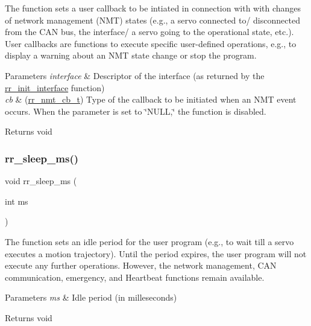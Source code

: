 The function sets a user callback to be intiated in connection with with changes of network management (N\+MT) states (e.\+g., a servo connected to/ disconnected from the C\+AN bus, the interface/ a servo going to the operational state, etc.). User callbacks are functions to execute specific user-\/defined operations, e.\+g., to display a warning about an N\+MT state change or stop the program. 


\begin{DoxyParams}{Parameters}
{\em interface} & Descriptor of the interface (as returned by the \hyperlink{group___common_ga472a4890dcc7d7a13123c56a06946d91}{rr\+\_\+init\+\_\+interface} function) \\
\hline
{\em cb} & (\hyperlink{api_8h_ae0f9f2b200672126bb1f6eb3e66c27fc}{rr\+\_\+nmt\+\_\+cb\+\_\+t}) Type of the callback to be initiated when an N\+MT event occurs. When the parameter is set to \char`\"{}\+N\+U\+L\+L,\char`\"{} the function is disabled. \\
\hline
\end{DoxyParams}
\begin{DoxyReturn}{Returns}
void 
\end{DoxyReturn}
\mbox{\label{group___utils_gaeb26028b83635e028ebc901e1cbf33a1}} 
\subsubsection{\texorpdfstring{rr\+\_\+sleep\+\_\+ms()}{rr\_sleep\_ms()}}
{\footnotesize\ttfamily void rr\+\_\+sleep\+\_\+ms (\begin{DoxyParamCaption}\item[{int}]{ms }\end{DoxyParamCaption})}



The function sets an idle period for the user program (e.\+g., to wait till a servo executes a motion trajectory). Until the period expires, the user program will not execute any further operations. However, the network management, C\+AN communication, emergency, and Heartbeat functions remain available. 


\begin{DoxyParams}{Parameters}
{\em ms} & Idle period (in milleseconds) \\
\hline
\end{DoxyParams}
\begin{DoxyReturn}{Returns}
void 
\end{DoxyReturn}
